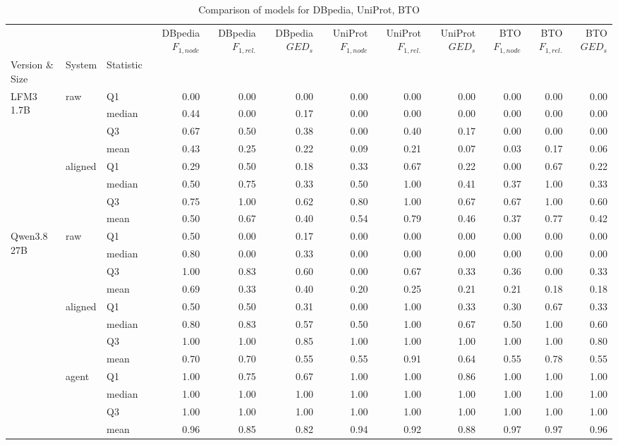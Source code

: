 \begin{table}
\caption{Comparison of models for DBpedia, UniProt, BTO}
\label{tab:compare_model_merged}
\begin{tabular}{lllrrrrrrrrr}
\toprule
 &  &  & DBpedia $F_{1,node}$ & DBpedia $F_{1,rel.}$ & DBpedia $GED_{s}$ & UniProt $F_{1,node}$ & UniProt $F_{1,rel.}$ & UniProt $GED_{s}$ & BTO $F_{1,node}$ & BTO $F_{1,rel.}$ & BTO $GED_{s}$ \\
Version \& Size & System & Statistic &  &  &  &  &  &  &  &  &  \\
\midrule
\multirow[t]{8}{*}{LFM3 1.7B} & \multirow[t]{4}{*}{raw} & Q1 & 0.00 & 0.00 & 0.00 & 0.00 & 0.00 & 0.00 & 0.00 & 0.00 & 0.00 \\
 &  & median & 0.44 & 0.00 & 0.17 & 0.00 & 0.00 & 0.00 & 0.00 & 0.00 & 0.00 \\
 &  & Q3 & 0.67 & 0.50 & 0.38 & 0.00 & 0.40 & 0.17 & 0.00 & 0.00 & 0.00 \\
 &  & mean & 0.43 & 0.25 & 0.22 & 0.09 & 0.21 & 0.07 & 0.03 & 0.17 & 0.06 \\
\cline{2-12}
 & \multirow[t]{4}{*}{aligned} & Q1 & 0.29 & 0.50 & 0.18 & 0.33 & 0.67 & 0.22 & 0.00 & 0.67 & 0.22 \\
 &  & median & 0.50 & 0.75 & 0.33 & 0.50 & 1.00 & 0.41 & 0.37 & 1.00 & 0.33 \\
 &  & Q3 & 0.75 & 1.00 & 0.62 & 0.80 & 1.00 & 0.67 & 0.67 & 1.00 & 0.60 \\
 &  & mean & 0.50 & 0.67 & 0.40 & 0.54 & 0.79 & 0.46 & 0.37 & 0.77 & 0.42 \\
\cline{1-12} \cline{2-12}
\multirow[t]{12}{*}{Qwen3.8 27B} & \multirow[t]{4}{*}{raw} & Q1 & 0.50 & 0.00 & 0.17 & 0.00 & 0.00 & 0.00 & 0.00 & 0.00 & 0.00 \\
 &  & median & 0.80 & 0.00 & 0.33 & 0.00 & 0.00 & 0.00 & 0.00 & 0.00 & 0.00 \\
 &  & Q3 & 1.00 & 0.83 & 0.60 & 0.00 & 0.67 & 0.33 & 0.36 & 0.00 & 0.33 \\
 &  & mean & 0.69 & 0.33 & 0.40 & 0.20 & 0.25 & 0.21 & 0.21 & 0.18 & 0.18 \\
\cline{2-12}
 & \multirow[t]{4}{*}{aligned} & Q1 & 0.50 & 0.50 & 0.31 & 0.00 & 1.00 & 0.33 & 0.30 & 0.67 & 0.33 \\
 &  & median & 0.80 & 0.83 & 0.57 & 0.50 & 1.00 & 0.67 & 0.50 & 1.00 & 0.60 \\
 &  & Q3 & 1.00 & 1.00 & 0.85 & 1.00 & 1.00 & 1.00 & 1.00 & 1.00 & 0.80 \\
 &  & mean & 0.70 & 0.70 & 0.55 & 0.55 & 0.91 & 0.64 & 0.55 & 0.78 & 0.55 \\
\cline{2-12}
 & \multirow[t]{4}{*}{agent} & Q1 & 1.00 & 0.75 & 0.67 & 1.00 & 1.00 & 0.86 & 1.00 & 1.00 & 1.00 \\
 &  & median & 1.00 & 1.00 & 1.00 & 1.00 & 1.00 & 1.00 & 1.00 & 1.00 & 1.00 \\
 &  & Q3 & 1.00 & 1.00 & 1.00 & 1.00 & 1.00 & 1.00 & 1.00 & 1.00 & 1.00 \\
 &  & mean & 0.96 & 0.85 & 0.82 & 0.94 & 0.92 & 0.88 & 0.97 & 0.97 & 0.96 \\
\cline{1-12} \cline{2-12}
\bottomrule
\end{tabular}
\end{table}
